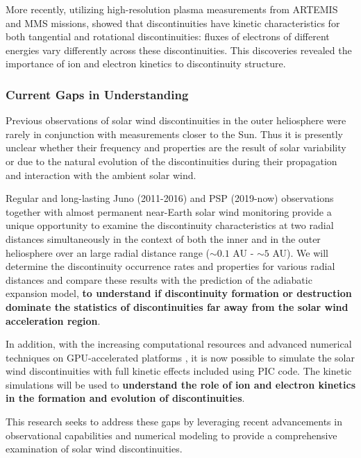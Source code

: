 \documentclass[
  letterpaper,
  DIV=11,
  numbers=noendperiod]{scrartcl}
\begin{document}
More recently, utilizing high-resolution plasma measurements from ARTEMIS and MMS missions, \citet{artemyevKineticNatureSolar2019} showed that discontinuities have kinetic characteristics for both tangential and rotational discontinuities: fluxes of electrons of different energies vary differently across these discontinuities. This discoveries revealed the importance of ion and electron kinetics to discontinuity structure.

\subsubsection{Current Gaps in Understanding}\label{current-gaps-in-understanding}

Previous observations of solar wind discontinuities in the outer heliosphere were rarely in conjunction with measurements closer to the Sun. Thus it is presently unclear whether their frequency and properties are the result of solar variability or due to the natural evolution of the discontinuities during their propagation and interaction with the ambient solar wind.

Regular and long-lasting Juno (2011-2016) and PSP (2019-now) observations together with almost permanent near-Earth solar wind monitoring provide a unique opportunity to examine the discontinuity characteristics at two radial distances simultaneously in the context of both the inner and in the outer heliosphere over an large radial distance range (\(\sim 0.1\) AU - \(\sim 5\) AU). We will determine the discontinuity occurrence rates and properties for various radial distances and compare these results with the prediction of the adiabatic expansion model, \textbf{to understand if discontinuity formation or destruction dominate the statistics of discontinuities far away from the solar wind acceleration region}.

In addition, with the increasing computational resources and advanced numerical techniques on GPU-accelerated platforms \citep{myersPortingWarpXGPUaccelerated2021}, it is now possible to simulate the solar wind discontinuities with full kinetic effects included using PIC code. The kinetic simulations will be used to \textbf{understand the role of ion and electron kinetics in the formation and evolution of discontinuities}.

This research seeks to address these gaps by leveraging recent advancements in observational capabilities and numerical modeling to provide a comprehensive examination of solar wind discontinuities.
\end{document}
